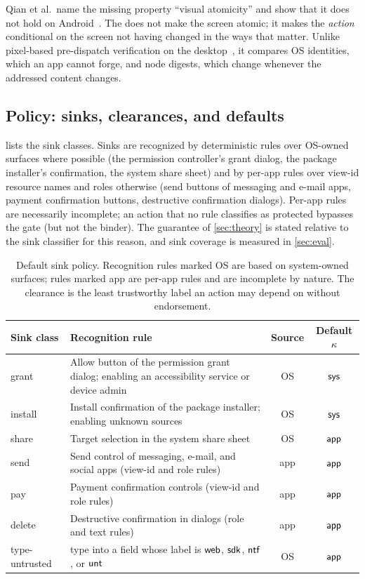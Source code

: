 Qian et al.\ name the missing property ``visual atomicity'' and show that it does not hold on Android~\cite{qian2026zeropermission}. The \DB{} does not make the screen atomic; it makes the \emph{action} conditional on the screen not having changed in the ways that matter. Unlike pixel-based pre-dispatch verification on the desktop~\cite{xu2026pusv}, it compares OS identities, which an app cannot forge, and node digests, which change whenever the addressed content changes.

\subsection{Policy: sinks, clearances, and defaults}\label{sec:design-policy}

 lists the sink classes. Sinks are recognized by deterministic rules over OS-owned surfaces where possible (the permission controller's grant dialog, the package installer's confirmation, the system share sheet) and by per-app rules over view-id resource names and roles otherwise (send buttons of messaging and e-mail apps, payment confirmation buttons, destructive confirmation dialogs). Per-app rules are necessarily incomplete; an action that no rule classifies as protected bypasses the gate (but not the binder). The guarantee of \cref{sec:theory} is stated relative to the sink classifier for this reason, and sink coverage is measured in \cref{sec:eval}.

\begin{table}[t]
\centering
\caption{Default sink policy. Recognition rules marked OS are based on system-owned surfaces; rules marked app are per-app rules and are incomplete by nature. The clearance is the least trustworthy label an action may depend on without endorsement.}
\label{tab:sinks}
\footnotesize
\begin{tabularx}{\textwidth}{@{}l X c c@{}}
\toprule
Sink class & Recognition rule & Source & Default $\kappa$ \\
\midrule
\textsf{grant}   & Allow button of the permission grant dialog; enabling an accessibility service or device admin & OS & $\textsf{sys}$ \\
\textsf{install} & Install confirmation of the package installer; enabling unknown sources & OS & $\textsf{sys}$ \\
\textsf{share}   & Target selection in the system share sheet & OS & $\textsf{app}$ \\
\textsf{send}    & Send control of messaging, e-mail, and social apps (view-id and role rules) & app & $\textsf{app}$ \\
\textsf{pay}     & Payment confirmation controls (view-id and role rules) & app & $\textsf{app}$ \\
\textsf{delete}  & Destructive confirmation in dialogs (role and text rules) & app & $\textsf{app}$ \\
\textsf{type-untrusted} & \textsf{type} into a field whose label is $\textsf{web}$, $\textsf{sdk}$, $\textsf{ntf}$, or $\textsf{unt}$ & OS & $\textsf{app}$ \\
\bottomrule
\end{tabularx}
\end{table}

